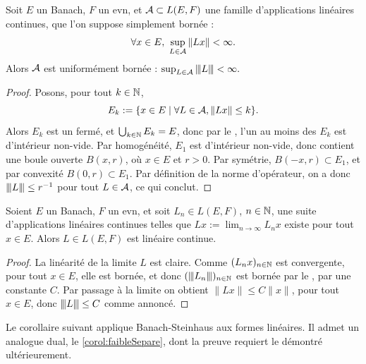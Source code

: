 \begin{theorem}
\label{th:BanachSteinhaus}
%
Soit $E$ un Banach, $F$ un evn, et $\mathcal{A} \subset L(E,F)$ une famille d'applications linéaires continues, que l'on suppose simplement bornée : 
\begin{equation}
	\forall x \in E,\ \sup_{L\in \mathcal{A}} \|Lx\| < \infty.
\end{equation}
Alors $\mathcal{A}$ est uniformément bornée :
$	\sup_{L \in \mathcal{A}} {\left\vert\kern-0.25ex\left\vert\kern-0.25ex\left\vert L \right\vert\kern-0.25ex\right\vert\kern-0.25ex\right\vert} < \infty.$
\end{theorem}

\begin{proof}
	Posons, pour tout $k \in \mathbb{N}$, 
	\begin{equation}
		E_k := \{x \in E \mid \forall L \in \mathcal{A}, \|Lx\| \leq k\}.
	\end{equation}
	Alors $E_k$ est un fermé, et $\bigcup_{k \in \mathbb{N}} E_k = E$, donc par le , l'un au moins des $E_k$ est d'intérieur non-vide. Par homogénéité, $E_1$ est d'intérieur non-vide, donc contient une boule ouverte $B(x,r)$, où $x \in E$ et $r>0$. Par symétrie, $B(-x,r) \subset E_1$, et par convexité $B(0,r) \subset E_1$. Par définition de la norme d'opérateur, on a donc ${\left\vert\kern-0.25ex\left\vert\kern-0.25ex\left\vert L \right\vert\kern-0.25ex\right\vert\kern-0.25ex\right\vert} \leq r^{-1}$ pour tout $L \in \mathcal{A}$, ce qui conclut.
\end{proof}

\begin{corollary}
\label{corol:limSimpleLin}
%
	Soient $E$ un Banach, $F$ un evn, et soit $L_n \in L(E,F)$, $n\in \mathbb{N}$, une suite d'applications linéaires continues telles que $Lx := \lim_{n \to \infty} L_n x$ existe pour tout $x \in E$. Alors $L\in L(E,F)$ est linéaire continue.
\end{corollary}

\begin{proof}
	La linéarité de la limite $L$ est claire. Comme $(L_n x)_{n \in \mathbb{N}}$ est convergente, pour tout $x \in E$, elle est bornée, et donc $({\left\vert\kern-0.25ex\left\vert\kern-0.25ex\left\vert L_n \right\vert\kern-0.25ex\right\vert\kern-0.25ex\right\vert})_{n \in \mathbb{N}}$ est bornée par le , par une constante $C$. Par passage à la limite on obtient $\|L x\| \leq C \|x\|$, pour tout $x \in E$, donc ${\left\vert\kern-0.25ex\left\vert\kern-0.25ex\left\vert L \right\vert\kern-0.25ex\right\vert\kern-0.25ex\right\vert} \leq C$ comme annoncé.
\end{proof}


Le corollaire suivant applique Banach-Steinhaus aux formes linéaires. Il admet un analogue dual, le \cref{corol:faibleSepare}, dont la preuve requiert le  démontré ultérieurement.


